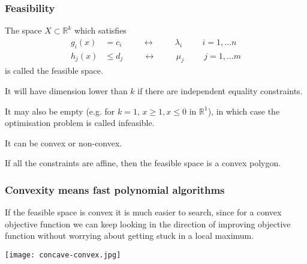 \documentclass[10pt,aspectratio=169,dvipsnames]{beamer}
\newcommand{\R}{\mathbb{R}}
\def\l{\lambda}
\def\m{\mu}
\begin{document}
\begin{frame}
  \frametitle{Feasibility}

  The space $X \subset \R^k$ which satisfies
\begin{align*}
  g_i(x) & = c_i \hspace{1cm}\leftrightarrow\hspace{1cm} \l_i \hspace{1cm} i = 1,\dots n \\
  h_j(x) & \leq d_j \hspace{1cm}\leftrightarrow\hspace{1cm} \m_j \hspace{1cm} j = 1,\dots m
\end{align*}
is called the \alert{feasible space}.

It will have dimension lower than $k$ if there are independent
equality constraints.

It may also be empty (e.g. for $k=1$, $x \geq 1, x \leq 0$ in $\R^1$), in which
case the optimisation problem is called \alert{infeasible}.

It can be \alert{convex} or \alert{non-convex}.

If all the constraints are affine, then the feasible space is a convex polygon.


\end{frame}


\begin{frame}
  \frametitle{Convexity means fast polynomial algorithms}

  If the feasible space is \alert{convex} it is much easier to search, since for a convex objective function we can keep looking in the direction of improving objective function without worrying about getting stuck in a local maximum.

  \centering
  \texttt{[image: concave-convex.jpg]}

\end{frame}
\end{document}
